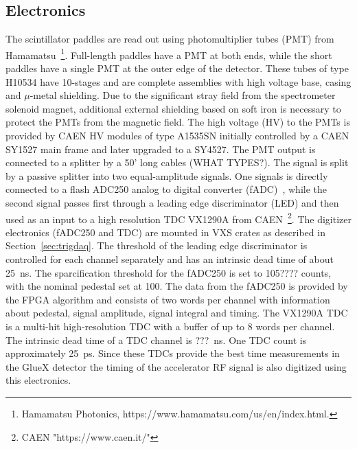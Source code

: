 \subsection{Electronics \label{sec:scelectronics}}
The scintillator paddles are read out using 
photomultiplier tubes (PMT) from Hamamatsu~\footnote{Hamamatsu Photonics, https://www.hamamatsu.com/us/en/index.html.}. Full-length paddles
have a PMT at both ends, while the short paddles have a single PMT
at the outer edge of the detector. These tubes of type H10534 have 10-stages and are complete assemblies with high voltage base, casing and $\mu$-metal shielding. Due to the significant stray field from the spectrometer solenoid magnet, additional external
shielding based on soft iron is necessary to protect the PMTs from the magnetic field.
The high voltage (HV) to the PMTs is provided by CAEN HV modules of type A1535SN initially controlled by a CAEN SY1527 main frame and
later upgraded to a SY4527.
The PMT output is connected to a splitter by a 50' long cables (WHAT TYPES?). The signal is split by
a passive splitter into two equal-amplitude signals. One signals is directly connected to a flash ADC250
analog to digital converter (fADC)~\cite{Dong:2007}, while the second signal passes first through a leading edge discriminator (LED) and then used as an input to a high resolution TDC VX1290A from CAEN~\footnote{CAEN "https://www.caen.it/"}. The digitizer electronics (fADC250 and TDC) are mounted in VXS crates as described in Section~\ref{sec:trigdaq}.
The threshold of the leading edge discriminator is controlled for each channel separately and has an intrinsic
dead time of about 25~ns.
The sparcification threshold for the fADC250 is set to 105???? counts, with the nominal pedestal set at 100. The data from the fADC250 is provided by the FPGA algorithm and consists
of two words per channel with information about pedestal, signal amplitude, signal integral and timing.
The VX1290A TDC is a multi-hit high-resolution TDC with a buffer of 
up to 8 words per channel. The intrinsic dead time of a TDC channel is ???~ns. One TDC count is approximately 25~ps.
Since these TDCs provide the best time measurements in the GlueX detector the timing of the accelerator RF signal is also
digitized using this electronics.


